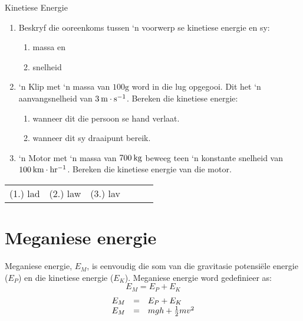 \begin{exercises}{Kinetiese Energie }
            \nopagebreak
        \label{m38785*id68123}\begin{enumerate}[noitemsep, label=\textbf{\arabic*}. ] 
            \label{m38785*uid69}\item Beskryf die ooreenkoms tussen ‘n voorwerp se kinetiese energie en sy:
\label{m38785*id68139}\begin{enumerate}[noitemsep, label=\textbf{\alph*}. ] 
            \label{m38785*uid70}\item  massa en
\label{m38785*uid71}\item snelheid
\end{enumerate}
                \label{m38785*uid72}\item ‘n Klip met ‘n massa van $100 \text{g}$ word in die lug opgegooi. Dit het ‘n aanvangsnelheid van $3\phantom{\rule{2pt}{0ex}}\text{m}\ensuremath{\cdot}\text{s}{}^{-1}$. Bereken die kinetiese energie:
\label{m38785*id68206}\begin{enumerate}[noitemsep, label=\textbf{\alph*}. ] 
            \label{m38785*uid73}\item wanneer dit die persoon se hand verlaat.
\label{m38785*uid74}\item  wanneer dit sy draaipunt bereik.
\end{enumerate}
                \label{m38785*uid75}\item ‘n Motor met ‘n massa van $700\phantom{\rule{2pt}{0ex}}\text{kg}$ beweeg teen ‘n konstante snelheid van $100\phantom{\rule{2pt}{0ex}}\text{km}\ensuremath{\cdot}\text{hr}{}^{-1}$. Bereken die kinetiese energie van die motor.
\end{enumerate}
  \label{m38785**end}
\practiceinfo
 \par \begin{tabular}[h]{cccccc}
 (1.) lad  &  (2.) law  &  (3.) lav  & \end{tabular}
\end{exercises}
         \section{Meganiese energie}
    \nopagebreak
      \label{m38786*id68299}Meganiese energie, ${E}_{M}$, is eenvoudig die som van die gravitasie potensi\"{e}le energie (${E}_{P}$) en die kinetiese energie (${E}_{K}$). Meganiese energie word gedefinieer as:
      \label{m38786*uid76}\nopagebreak\noindent{}
    \begin{equation}
    {E}_{M}={E}_{P}+{E}_{K}
      \end{equation}
      \label{m38786*uid77}\nopagebreak\noindent{}
    \begin{equation}
    \begin{array}{ccc}\hfill {E}_{M}& =& {E}_{P}+{E}_{K}\hfill \\ \hfill {E}_{M}& =& mgh+\frac{1}{2}m{v}^{2}\hfill \end{array}
      \end{equation}
      \label{m38786*eip-384}
      \label{m38786*uid78}
            

